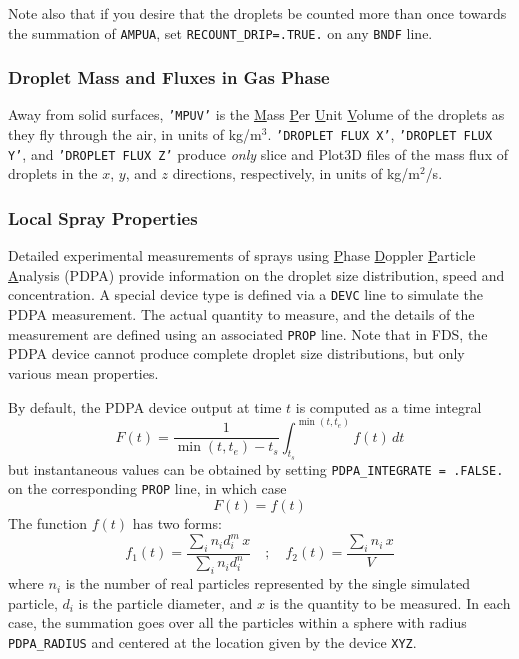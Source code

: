 \documentclass[11pt]{book}
\newcommand{\ct}{\tt\small}
\newcommand{\be}{\begin{equation}}
\newcommand{\ee}{\end{equation}}
\begin{document}
Note also that if you desire that the droplets be counted more than once towards the summation of {\ct AMPUA}, set {\ct RECOUNT\_DRIP=.TRUE.} on any {\ct BNDF} line.



\subsubsection{Droplet Mass and Fluxes in Gas Phase}

Away from solid surfaces, {\ct 'MPUV'} is the \underline{M}ass \underline{P}er \underline{U}nit \underline{V}olume of the droplets as they fly through
the air, in units of kg/m$^3$.  {\ct 'DROPLET FLUX X'},  {\ct 'DROPLET FLUX Y'}, and {\ct 'DROPLET FLUX Z'} produce {\em only} slice and Plot3D files
of the mass flux of droplets in the $x$, $y$, and $z$ directions, respectively, in units of kg/m$^2$/s.

\subsubsection{Local Spray Properties}
\label{PDPA}

Detailed experimental measurements of sprays using \underline{P}hase \underline{D}oppler \underline{P}article
\underline{A}nalysis (PDPA) provide information on the droplet size distribution, speed and concentration.
A special device type is defined via a {\ct DEVC} line to simulate the PDPA measurement. The actual quantity to measure, and the details of the
measurement are defined using an associated {\ct PROP} line. Note that in FDS, the PDPA device cannot produce complete droplet size
distributions, but only various mean properties.

By default, the PDPA device output at time $t$ is computed as a time integral
\be
F(t) = \frac{1}{\min(t,t_e)-t_s} \int_{t_s}^{\min(t,t_e)} f(t) \, dt
\ee
but instantaneous values can be obtained by setting {\ct PDPA\_INTEGRATE = .FALSE.} on the corresponding {\ct PROP} line, in which case
\be
F(t) = f(t)
\ee
The function $f(t)$ has two forms:
\be
f_1(t) =  \frac{\sum_i n_i d_i^m \, x}{\sum_i n_i d_i^n}  \quad ; \quad
f_2(t) = \frac{\sum_i n_i \, x}{V}
\ee
where $n_i$ is the number of real particles represented by the single simulated particle, $d_i$
is the particle diameter, and $x$ is the quantity to be measured. In each case, the summation goes over all the particles within a sphere
with radius {\ct PDPA\_RADIUS} and centered at the location given by the device {\ct XYZ}.
\end{document}

